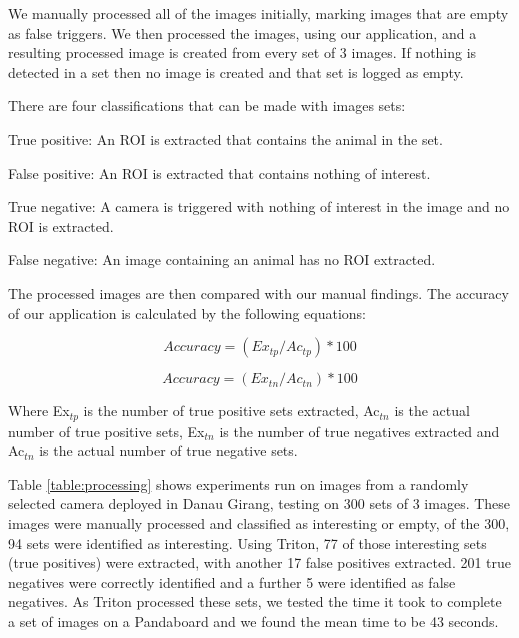 		We manually processed all of the images initially, marking images that are empty as false triggers. We then processed the images, using our application, and a resulting processed image is created from every set of 3 images. If nothing is detected in a set then no image is created and that set is logged as empty. 
		
		There are four classifications that can be made with images sets:
		\begin{description}
			\item True positive: An ROI is extracted that contains the animal in the set.
			\item False positive: An ROI is extracted that contains nothing of interest.
			\item True negative: A camera is triggered with nothing of interest in the image and no ROI is extracted.
			\item False negative: An image containing an animal has no ROI extracted.
		\end{description}
		
		The processed images are then compared with our manual findings. The accuracy of our application is calculated by the following equations:
		
		\begin{equation} Accuracy = (Ex_{tp} / Ac_{tp}) * 100 \end{equation} 

		\begin{equation} Accuracy = (Ex_{tn} / Ac_{tn}) * 100 \end{equation}	
		
			Where Ex$_{tp}$  is the number of true positive sets extracted, Ac$_{tn}$  is the actual number of true positive sets, Ex$_{tn}$ is the number of true negatives extracted and Ac$_{tn}$ is the actual number of true negative sets.
		
		Table \ref{table:processing} shows experiments run on images from a randomly selected camera deployed in Danau Girang, testing on 300 sets of 3 images. These images were manually processed and classified as interesting or empty, of the 300, 94 sets were identified as interesting. Using Triton, 77 of those interesting sets (true positives) were extracted, with another 17 false positives extracted. 201 true negatives were correctly identified and a further 5 were identified as false negatives. As Triton processed these sets, we tested the time it took to complete a set of images on a Pandaboard and we found the mean time to be 43 seconds. 
		
